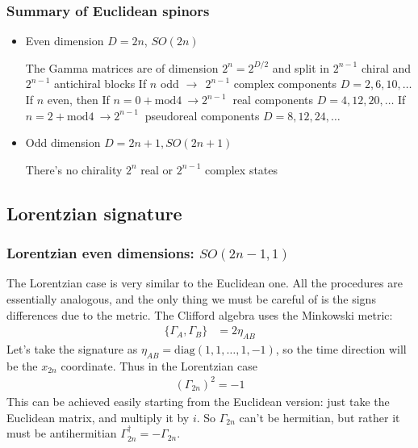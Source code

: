 \documentclass[a4paper,12pt]{article}
\numberwithin{equation}{section}
\numberwithin{exe}{section}
\renewcommand{\dag}{{\dagger}}
\newcommand{\G}{{\Gamma}}
\begin{document}
\subsubsection{Summary of Euclidean spinors}


	\begin{itemize}
	\item Even dimension $D=2n$, $SO(2n)$
	
	The Gamma matrices are of dimension $2^n=2^{D/2}$ and split in $2^{n-1}$ chiral and $2^{n-1}$ antichiral blocks
		\subitem If $n$ odd $\rightarrow\ \ 2^{n-1}$ complex components \hspace{1cm} $D=2,6,10,\hdots$
		\subitem If $n$ even, then
			\subsubitem If $n=0+\mbox{mod}4\ \rightarrow 2^{n-1}\ $ real components \hspace{1cm} $D=4,12,20,\hdots$
			\subsubitem If $n=2+\mbox{mod}4\ \rightarrow 2^{n-1}\ $ pseudoreal components \hspace{1cm} $D=8,12,24,\hdots$
	\item Odd dimension $D=2n+1, SO(2n+1)$
	
	There's no chirality
		\subitem $2^n$ real or $2^{n-1}$ complex states 
	\end{itemize}


\subsection{Lorentzian signature}

\subsubsection{Lorentzian even dimensions: $SO(2n-1,1)$}

The Lorentzian case is very similar to the Euclidean one. All the procedures are essentially analogous, and the only thing we must be careful of is the signs differences due to the metric. The Clifford algebra uses the Minkowski metric:
	\begin{align}\label{}
	\{ \G_A,\G_B \} &= 2\eta_{AB}
	\end{align}
Let's take the signature as $\eta_{AB}=\mbox{diag}(1,1,\hdots,1,-1)$, so the time direction will be the $x_{2n}$ coordinate. Thus in the Lorentzian case 
	\begin{align}\label{}
	\left( \G_{2n} \right)^2=-1
	\end{align}
This can be achieved easily starting from the Euclidean version: just take the Euclidean matrix, and multiply it by $i$. So $\G_{2n}$ can't be hermitian, but rather it must be antihermitian $\G_{2n}^\dag=-\G_{2n}$. 
\end{document}
